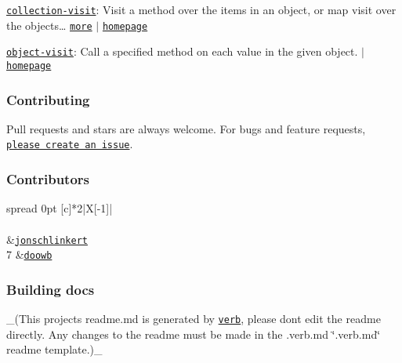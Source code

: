 \begin{DoxyItemize}
\item \href{https://www.npmjs.com/package/collection-visit}{\tt collection-\/visit}\+: Visit a method over the items in an object, or map visit over the objects… \href{https://github.com/jonschlinkert/collection-visit}{\tt more} $\vert$ \href{https://github.com/jonschlinkert/collection-visit}{\tt homepage}
\item \href{https://www.npmjs.com/package/object-visit}{\tt object-\/visit}\+: Call a specified method on each value in the given object. $\vert$ \href{https://github.com/jonschlinkert/object-visit}{\tt homepage}
\end{DoxyItemize}

\subsubsection*{Contributing}

Pull requests and stars are always welcome. For bugs and feature requests, \href{../../issues/new}{\tt please create an issue}.

\subsubsection*{Contributors}

\tabulinesep=1mm
\begin{longtabu} spread 0pt [c]{*{2}{|X[-1]}|}
\hline
\rowcolor{\tableheadbgcolor}\\
\endfirsthead
\hline
\endfoot
\hline
\rowcolor{\tableheadbgcolor}\\
  &\href{https://github.com/jonschlinkert}{\tt jonschlinkert}   \\
7  &\href{https://github.com/doowb}{\tt doowb}   \\
\end{longtabu}


\subsubsection*{Building docs}

\+\_\+(This project\textquotesingle{}s readme.\+md is generated by \href{https://github.com/verbose/verb-generate-readme}{\tt verb}, please don\textquotesingle{}t edit the readme directly. Any changes to the readme must be made in the .verb.\+md \char`\"{}.\+verb.\+md\char`\"{} readme template.)\+\_\+

